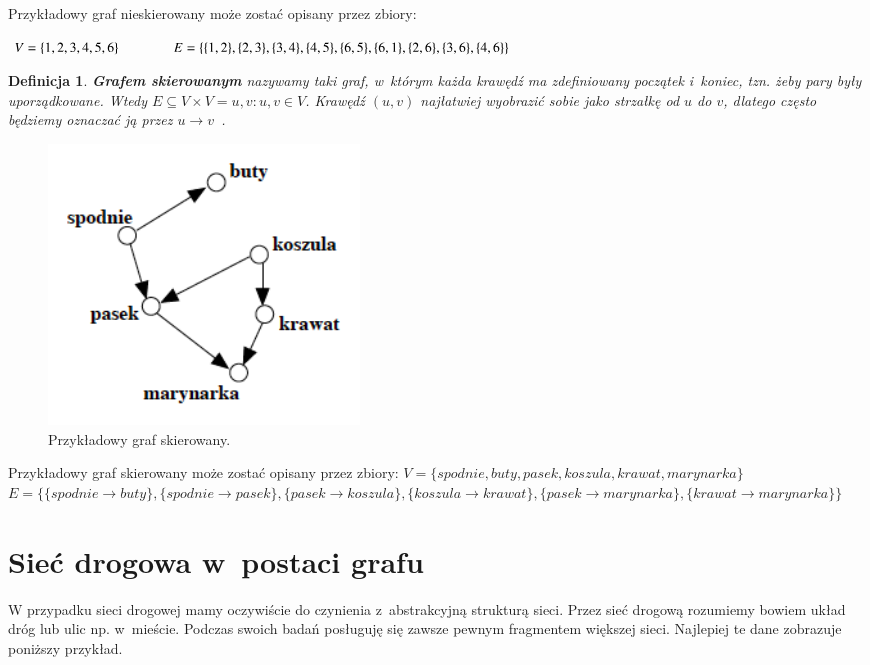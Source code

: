 \documentclass[twoside,12pt]{report}
\newtheorem{definition}{Definicja} %
\begin{document}
Przykładowy graf nieskierowany może zostać opisany przez zbiory:
\begin{center}
\begin{math}
V=\{1,2,3,4,5,6\} \hspace*{40px} E=\{\{1,2\},\{2,3\},\{3,4\},\{4,5\},\{6,5\},\{6,1\},\{2,6\},\{3,6\},\{4,6\}\}
\end{math}
\end{center}

\vspace*{30px}
\begin{definition}\label{Graf skierowany}
\textbf{Grafem skierowanym} nazywamy taki graf, w~którym każda krawędź ma zdefiniowany początek i~koniec, tzn. żeby pary były uporządkowane. Wtedy $E \subseteq V \times V = {{u,v}:u,v \in V}$.
Krawędź $(u,v)$ najłatwiej wyobrazić sobie jako strzałkę od $u$ do $v$, dlatego często będziemy oznaczać ją przez $u \rightarrow v$~\cite{grafy}.
\end{definition}

\begin{figure}[ht]
\begin{center}
\includegraphics[width=0.40\textwidth]{img/graf2}
\caption{Przykładowy graf skierowany.} 
\end{center}
\end{figure}

Przykładowy graf skierowany może zostać opisany przez zbiory:
\newline
\begin{math}
V=\{spodnie, buty, pasek, koszula, krawat, marynarka\}
\end{math}
\newline
\begin{math}
E=\{\{spodnie \rightarrow buty\},\{spodnie  \rightarrow pasek\},
	\{pasek \rightarrow koszula\},\{koszula \rightarrow krawat\},
	\{pasek \rightarrow marynarka\},\{krawat \rightarrow marynarka\}\}
\end{math}

\section{Sieć drogowa w~postaci grafu}
W przypadku sieci drogowej mamy oczywiście do czynienia z~abstrakcyjną strukturą sieci. Przez sieć drogową rozumiemy bowiem układ dróg lub ulic np. w~mieście. Podczas swoich badań posługuję się zawsze pewnym fragmentem większej sieci. Najlepiej te dane zobrazuje poniższy przykład.
\end{document}

